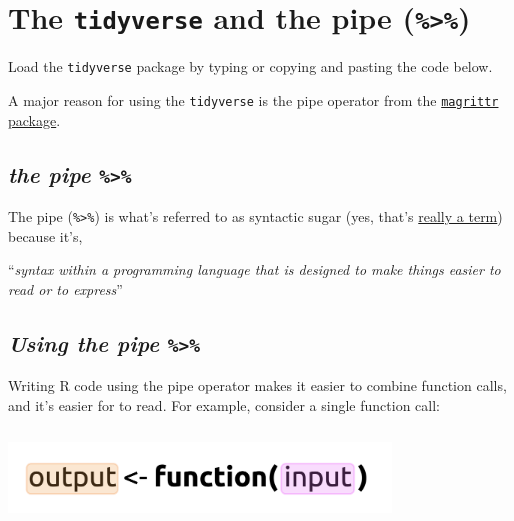 \documentclass[letterpaper,12pt,twoside,]{pinp}
\begin{document}
\hypertarget{the-tidyverse-and-the-pipe}{%
\section{\texorpdfstring{The \texttt{tidyverse} and the pipe
(\texttt{\%\textgreater{}\%})}{The tidyverse and the pipe (\%\textgreater\%)}}\label{the-tidyverse-and-the-pipe}}

Load the \texttt{tidyverse} package by typing or copying and pasting the
code below.

\begin{Shaded}
\begin{Highlighting}[]
\NormalTok{(}\NormalTok{)}
\end{Highlighting}
\end{Shaded}

A major reason for using the \texttt{tidyverse} is the pipe operator
from the \href{https://magrittr.tidyverse.org/}{\texttt{magrittr}
package}.

\hypertarget{the-pipe}{%
\subsection{\texorpdfstring{\textbf{\emph{the pipe
\texttt{\%\textgreater{}\%}}}}{the pipe \%\textgreater\%}}\label{the-pipe}}

The pipe (\texttt{\%\textgreater{}\%}) is what's referred to as
syntactic sugar (yes, that's
\href{https://en.wikipedia.org/wiki/Syntactic_sugar}{really a term})
because it's,

``\emph{syntax within a programming language that is designed to make
things easier to read or to express}''

\hypertarget{using-the-pipe}{%
\subsection{\texorpdfstring{\textbf{\emph{Using the pipe
\texttt{\%\textgreater{}\%}}}}{Using the pipe \%\textgreater\%}}\label{using-the-pipe}}

Writing R code using the pipe operator makes it easier to combine
function calls, and it's easier for to read. For example, consider a
single function call:

\begin{center}\includegraphics[width=4in,height=1in]{../img/pipe-args-01} \end{center}
\end{document}
